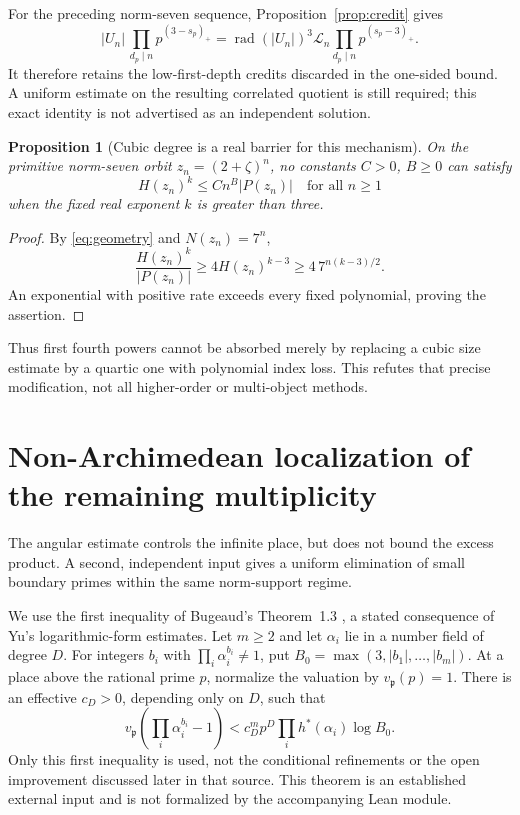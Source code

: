 \documentclass[11pt]{amsart}
\newtheorem{proposition}[theorem]{Proposition}
\theoremstyle{definition}\newtheorem{definition}[theorem]{Definition}
\theoremstyle{remark}\newtheorem{remark}[theorem]{Remark}
\newcommand{\rad}{\operatorname{rad}}\newcommand{\eps}{\varepsilon}
\begin{document}
For the preceding norm-seven sequence, Proposition~\ref{prop:credit} gives
\[
 |U_n|\,\prod_{d_p\mid n}p^{(3-s_p)_+}
  =\rad(|U_n|)^3\mathcal L_n
    \prod_{d_p\mid n}p^{(s_p-3)_+}.
\]
It therefore retains the low-first-depth credits discarded in the one-sided bound. A uniform estimate on the resulting correlated quotient is still required; this exact identity is not advertised as an independent solution.

\begin{proposition}[Cubic degree is a real barrier for this mechanism]\label{prop:degree}
On the primitive norm-seven orbit $z_n=(2+\zeta)^n$, no constants $C>0$, $B\ge0$ can satisfy
\[
 H(z_n)^k\le C n^B |P(z_n)|\quad\text{for all }n\ge1
\]
when the fixed real exponent $k$ is greater than three.
\end{proposition}
\begin{proof}
By \eqref{eq:geometry} and $N(z_n)=7^n$,
\[
 \frac{H(z_n)^k}{|P(z_n)|}
 \ge4H(z_n)^{k-3}\ge4\,7^{n(k-3)/2}.
\]
An exponential with positive rate exceeds every fixed polynomial, proving the assertion.
\end{proof}
Thus first fourth powers cannot be absorbed merely by replacing a cubic size estimate by a quartic one with polynomial index loss. This refutes that precise modification, not all higher-order or multi-object methods.

\section{Non-Archimedean localization of the remaining multiplicity}
\label{sec:adic-moving}
The angular estimate controls the infinite place, but does not bound the excess product. A second, independent input gives a uniform elimination of small boundary primes within the same norm-support regime.

We use the first inequality of Bugeaud's Theorem~1.3 \cite{bugeaud}, a stated consequence of Yu's logarithmic-form estimates. Let $m\ge2$ and let $\alpha_i$ lie in a number field of degree $D$. For integers $b_i$ with $\prod_i\alpha_i^{b_i}\ne1$, put $B_0=\max(3,|b_1|,\ldots,|b_m|)$. At a place above the rational prime $p$, normalize the valuation by $v_{\mathfrak p}(p)=1$. There is an effective $c_D>0$, depending only on $D$, such that
\begin{equation}\label{eq:yu-input}
 v_{\mathfrak p}\left(\prod_i\alpha_i^{b_i}-1\right)
 <c_D^m p^D\prod_i h^*(\alpha_i)\log B_0.
\end{equation}
Only this first inequality is used, not the conditional refinements or the open improvement discussed later in that source. This theorem is an established external input and is not formalized by the accompanying Lean module.
\end{document}
